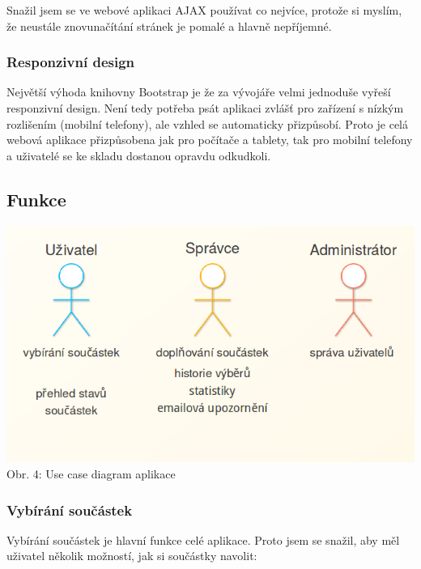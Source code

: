 \documentclass[12pt, a4paper, oneside]{article}
\begin{document}
Snažil jsem se ve webové aplikaci AJAX používat co nejvíce, protože si myslím, že neustále znovunačítání stránek je pomalé a hlavně nepříjemné.

\subsubsection{Responzivní design}

Největší výhoda knihovny Bootstrap je že za vývojáře velmi jednoduše vyřeší responzivní design. Není tedy potřeba psát aplikaci zvlášť pro zařízení s nízkým rozlišením (mobilní telefony), ale vzhled se automaticky přizpůsobí. Proto je celá webová aplikace přizpůsobena jak pro počítače a tablety, tak pro mobilní telefony a uživatelé se ke skladu dostanou opravdu odkudkoli.

\subsection{Funkce}

\begin{minipage}{\textwidth}
\begin{center}
\hspace*{-2cm}
\includegraphics[scale=0.55]{img/use_case_uml.png}
\\
\caption{Obr. 4: Use case diagram aplikace}
\end{center}
\end{minipage}
\vspace{4mm}

\subsubsection{Vybírání součástek}

Vybírání součástek je hlavní funkce celé aplikace. Proto jsem se snažil, aby měl uživatel několik možností, jak si součástky navolit:
\end{document}
